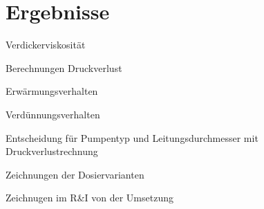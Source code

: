 \section{Ergebnisse}
\label{sec:ergebnisse}

Verdickerviskosität

Berechnungen Druckverlust

Erwärmungsverhalten

Verdünnungsverhalten

Entscheidung für Pumpentyp und Leitungsdurchmesser mit Druckverlustrechnung 

Zeichnungen der Dosiervarianten

Zeichnugen im R\&I von der Umsetzung

